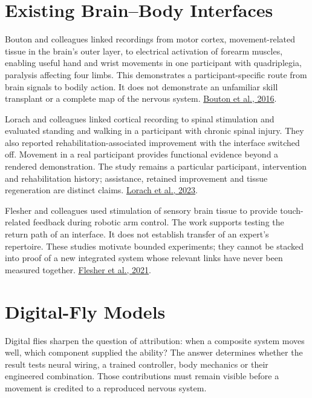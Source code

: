 \section{Existing Brain--Body Interfaces}

Bouton and colleagues linked recordings from motor cortex, movement-related tissue in the brain's outer layer, to electrical activation of forearm muscles, enabling useful hand and wrist movements in one participant with quadriplegia, paralysis affecting four limbs. This demonstrates a participant-specific route from brain signals to bodily action. It does not demonstrate an unfamiliar skill transplant or a complete map of the nervous system. \href{https://www.nature.com/articles/nature17435}{Bouton et al., 2016}.\par

Lorach and colleagues linked cortical recording to spinal stimulation and evaluated standing and walking in a participant with chronic spinal injury. They also reported rehabilitation-associated improvement with the interface switched off. Movement in a real participant provides functional evidence beyond a rendered demonstration. The study remains a particular participant, intervention and rehabilitation history; assistance, retained improvement and tissue regeneration are distinct claims. \href{https://www.nature.com/articles/s41586-023-06094-5}{Lorach et al., 2023}.\par

Flesher and colleagues used stimulation of sensory brain tissue to provide touch-related feedback during robotic arm control. The work supports testing the return path of an interface. It does not establish transfer of an expert's repertoire. These studies motivate bounded experiments; they cannot be stacked into proof of a new integrated system whose relevant links have never been measured together. \href{https://pubmed.ncbi.nlm.nih.gov/34016775/}{Flesher et al., 2021}.\par

\section{Digital-Fly Models}

Digital flies sharpen the question of attribution: when a composite system
moves well, which component supplied the ability? The answer determines
whether the result tests neural wiring, a trained controller, body mechanics
or their engineered combination. Those contributions must remain visible
before a movement is credited to a reproduced nervous system.\par

